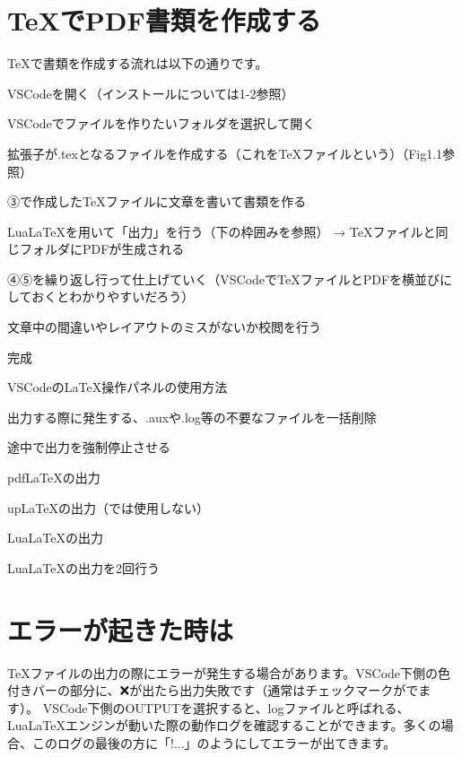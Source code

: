 \begin{multicols*}{2}
\section{\TeX でPDF書類を作成する}
\TeX で書類を作成する流れは以下の通りです。
\begin{enumcircle}
    \item VSCodeを開く（インストールについては1-2参照）
    \item VSCodeでファイルを作りたいフォルダを選択して開く
    \item 拡張子が.texとなるファイルを作成する（これを\TeX ファイルという）（Fig1.1参照）
    \item ③で作成した\TeX ファイルに文章を書いて書類を作る
    \item Lua\LaTeX を用いて「出力」を行う（下の枠囲みを参照） → \TeX ファイルと同じフォルダにPDFが生成される
    \item ④⑤を繰り返し行って仕上げていく（VSCodeで\TeX ファイルとPDFを横並びにしておくとわかりやすいだろう）
    \item 文章中の間違いやレイアウトのミスがないか校閲を行う
    \item 完成
\end{enumcircle}
\begin{framebox-simple}{VSCodeの\LaTeX 操作パネルの使用方法}
\begin{enumbrackets}
    \item 出力する際に発生する、.auxや.log等の不要なファイルを一括削除
    \item 途中で出力を強制停止させる
    \item pdf\LaTeX の出力
    \item up\LaTeX の出力（\BunTeX では使用しない）
    \item Lua\LaTeX の出力
    \item Lua\LaTeX の出力を2回行う
\end{enumbrackets}
\end{framebox-simple}


\section{エラーが起きた時は}%
\TeX ファイルの出力の際にエラーが発生する場合があります。VSCode下側の色付きバーの部分に、❌が出たら出力失敗です（通常はチェックマークがでます）。
VSCode下側のOUTPUTを選択すると、logファイルと呼ばれる、Lua\LaTeX エンジンが動いた際の動作ログを確認することができます。多くの場合、このログの最後の方に「!...」のようにしてエラーが出てきます。


\end{multicols*}
